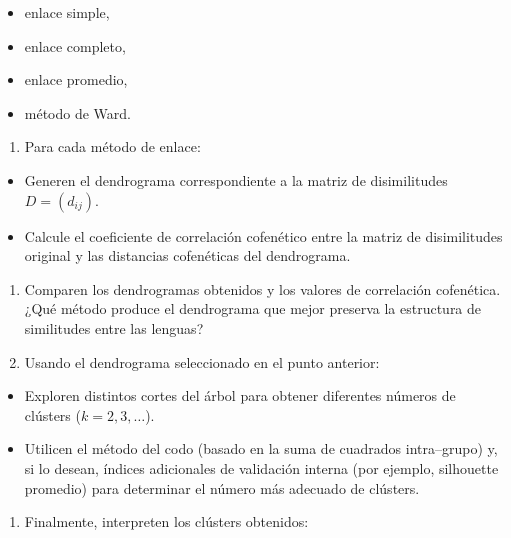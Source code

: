 \documentclass[
]{book}
\providecommand{\tightlist}{%
  \setlength{\itemsep}{0pt}\setlength{\parskip}{0pt}}
\begin{document}
\begin{itemize}
\item
  enlace simple,
\item
  enlace completo,
\item
  enlace promedio,
\item
  método de Ward.
\end{itemize}

\begin{enumerate}
\def\labelenumi{\arabic{enumi})}
\setcounter{enumi}{2}
\tightlist
\item
  Para cada método de enlace:
\end{enumerate}

\begin{itemize}
\item
  Generen el dendrograma correspondiente a la matriz de disimilitudes \(D = (d_{ij})\).
\item
  Calcule el coeficiente de correlación cofenético entre la matriz de disimilitudes original y las distancias cofenéticas del dendrograma.
\end{itemize}

\begin{enumerate}
\def\labelenumi{\arabic{enumi})}
\setcounter{enumi}{3}
\item
  Comparen los dendrogramas obtenidos y los valores de correlación cofenética. ¿Qué método produce el dendrograma que mejor preserva la estructura de similitudes entre las lenguas?
\item
  Usando el dendrograma seleccionado en el punto anterior:
\end{enumerate}

\begin{itemize}
\item
  Exploren distintos cortes del árbol para obtener diferentes números de clústers (\(k=2,3,\dots\)).
\item
  Utilicen el método del codo (basado en la suma de cuadrados intra--grupo) y, si lo desean, índices adicionales de validación interna (por ejemplo, silhouette promedio) para determinar el número más adecuado de clústers.
\end{itemize}

\begin{enumerate}
\def\labelenumi{\arabic{enumi})}
\setcounter{enumi}{5}
\tightlist
\item
  Finalmente, interpreten los clústers obtenidos:
\end{enumerate}
\end{document}
